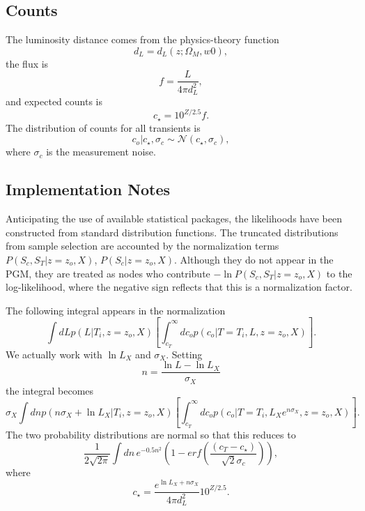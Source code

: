 \documentclass[preprint,3p]{elsarticle}
\begin{document}
\subsection{Counts}
The luminosity distance comes from the physics-theory function
\begin{equation}
d_L = d_L(z; \Omega_M, w0),
\end{equation}
the flux is
\begin{equation}
f = \frac{L}{4\pi d_L^2},
\end{equation}
and expected counts is
\begin{equation}
c_\star = 10^{Z/2.5}f.
\end{equation}
The distribution of counts for all transients is 
\begin{equation}
c_o | c_\star, \sigma_c \sim \mathcal{N}(c_\star, \sigma_c),
\end{equation}
where $\sigma_c$ is the measurement noise.

\subsection{Implementation Notes}
Anticipating the use of available statistical packages, the likelihoods have been constructed
from standard distribution functions.  The truncated distributions from sample selection
are accounted by the normalization 
terms $P(S_c, S_T| z=z_o, X)$, $P(S_c| z=z_o, X)$.  Although they do not appear
in the PGM, they are treated as nodes who contribute 
$-\ln{P(S_c, S_T| z=z_o, X)}$ to the log-likelihood, where the negative sign reflects that this is a normalization
factor.


The following integral appears in the normalization
\begin{equation}
\int dL p(L|T_i, z=z_o, X)  \left[\int_{c_T}^{\infty} dc_o  p(c_o | T=T_i, L, z=z_o, X)\right].
\end{equation}
We actually work with $\ln{L_X}$ and $\sigma_X$.  Setting
\begin{equation}
n=\frac{\ln{L}-\ln{L_X}}{\sigma_X}
\end{equation}
the integral becomes
 \begin{equation}
\sigma_X \int dn p(n\sigma_X + \ln{L_X} |T_i, z=z_o, X)  \left[\int_{c_T}^{\infty} dc_o  p(c_o | T=T_i, L_Xe^{n\sigma_X}, z=z_o, X)\right].
\end{equation}
The two probability distributions are normal so that this reduces to
 \begin{equation}
\frac{1}{2\sqrt{2\pi}} \int dn\, e^{-0.5n^2} \left(1-erf\left(\frac{(c_T - c_\star)}{\sqrt{2}\sigma_c}\right)\right),
\end{equation}
where
\begin{equation}
c_\star = \frac{e^{\ln{L_X}+n\sigma_X}}{4\pi d_L^2}10^{Z/2.5}.
\end{equation}
\end{document}
